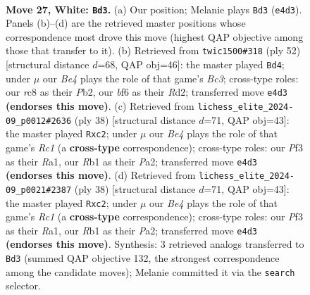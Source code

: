 \documentclass[11pt]{article}
\begin{document}
\clearpage

\begin{figure}[p]\centering
\begin{subfigure}{0.46\textwidth}\centering
\resizebox{\linewidth}{!}{%
\newchessgame
\chessboard[
  setfen={2r3nr/p4k1p/2p2bp1/8/4BB2/5P1P/PPP2KP1/RR6 w - - 4 27},
  showmover=false,
  pgfstyle=straightmove, color=movearrow, markmove={e4-d3}
]}
\caption{}
\end{subfigure}\hfill
\begin{subfigure}{0.46\textwidth}\centering
\resizebox{\linewidth}{!}{%
\newchessgame
\chessboard[
  setfen={r2r4/pp2bk1p/5p2/3p4/4p1P1/P1B1P2P/1P1R1P2/2K3R1 w - - 2 27},
  showmover=false,
  pgfstyle=straightmove, color=movearrow, markmove={c3-d4}
]}
\caption{}
\end{subfigure}
\\[4pt]
\begin{subfigure}{0.46\textwidth}\centering
\resizebox{\linewidth}{!}{%
\newchessgame
\chessboard[
  setfen={4k2r/2p1b1pp/p3p3/1p4r1/3B4/2P5/PPp2PPP/R1R3K1 w k - 2 20},
  showmover=false,
  pgfstyle=straightmove, color=movearrow, markmove={c1-c2}
]}
\caption{}
\end{subfigure}\hfill
\begin{subfigure}{0.46\textwidth}\centering
\resizebox{\linewidth}{!}{%
\newchessgame
\chessboard[
  setfen={4k2r/2p1b1pp/p3p3/1p4r1/3B4/2P5/PPp2PPP/R1R3K1 w k - 2 20},
  showmover=false,
  pgfstyle=straightmove, color=movearrow, markmove={c1-c2}
]}
\caption{}
\end{subfigure}
\caption{\textbf{Move 27, White: \texttt{Bd3}.} (a) Our position; Melanie plays \texttt{Bd3} (\texttt{e4d3}). Panels (b)--(d) are the retrieved master positions whose correspondence most drove this move (highest QAP objective among those that transfer to it). (b) Retrieved from \texttt{twic1500\#318} (ply 52) [structural distance $d$=68, QAP obj=46]: the master played \texttt{Bd4}; under $\mu$ our \emph{Be4} plays the role of that game's \emph{Bc3}; cross-type roles: our \emph{r}c8 as their \emph{P}b2, our \emph{b}f6 as their \emph{R}d2; transferred move \texttt{e4d3} \textbf{(endorses this move)}. (c) Retrieved from \texttt{lichess\_elite\_2024-09\_p0012\#2636} (ply 38) [structural distance $d$=71, QAP obj=43]: the master played \texttt{Rxc2}; under $\mu$ our \emph{Be4} plays the role of that game's \emph{Rc1} (a \textbf{cross-type} correspondence); cross-type roles: our \emph{P}f3 as their \emph{R}a1, our \emph{R}b1 as their \emph{P}a2; transferred move \texttt{e4d3} \textbf{(endorses this move)}. (d) Retrieved from \texttt{lichess\_elite\_2024-09\_p0021\#2387} (ply 38) [structural distance $d$=71, QAP obj=43]: the master played \texttt{Rxc2}; under $\mu$ our \emph{Be4} plays the role of that game's \emph{Rc1} (a \textbf{cross-type} correspondence); cross-type roles: our \emph{P}f3 as their \emph{R}a1, our \emph{R}b1 as their \emph{P}a2; transferred move \texttt{e4d3} \textbf{(endorses this move)}. Synthesis: 3 retrieved analogs transferred to \texttt{Bd3} (summed QAP objective 132, the strongest correspondence among the candidate moves); Melanie committed it via the \texttt{search} selector.}
\label{fig:thought-m52}
\end{figure}
\end{document}
